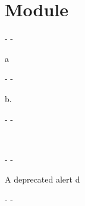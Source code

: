 \section{Module }\label{Alerts}%
\label{Alerts--val-a}\begin{ocamlindent}\begin{description}\kern-\topsep
\makeatletter\advance\@topsepadd-\topsep\makeatother%
\item[{deprecated}]{a}\end{description}%
\end{ocamlindent}%
\medbreak
\label{Alerts--val-b}\begin{ocamlindent}\begin{description}\kern-\topsep
\makeatletter\advance\@topsepadd-\topsep\makeatother%
\item[{deprecated}]{b.}\end{description}%
\end{ocamlindent}%
\medbreak
\label{Alerts--val-c}\begin{ocamlindent}\begin{description}\kern-\topsep
\makeatletter\advance\@topsepadd-\topsep\makeatother%
\item[{deprecated}]{}\end{description}%
\end{ocamlindent}%
\medbreak
\label{Alerts--module-Top1}\label{Alerts-Top1}\begin{ocamlindent}\end{ocamlindent}%
\\
\label{Alerts--val-d}\begin{ocamlindent}\begin{description}\kern-\topsep
\makeatletter\advance\@topsepadd-\topsep\makeatother%
\item[{deprecated}]{A deprecated alert d}\end{description}%
\end{ocamlindent}%
\medbreak
\label{Alerts--val-d2}\begin{ocamlindent}\begin{description}\kern-\topsep
\makeatletter\advance\@topsepadd-\topsep\makeatother%
\item[{deprecated}]{}\end{description}%
\end{ocamlindent}%
